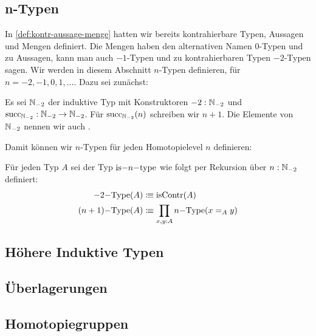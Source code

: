 \subsection{n-Typen}
In \cref{def:kontr-aussage-menge} hatten wir bereits kontrahierbare Typen, Aussagen und Mengen definiert.
Die Mengen haben den alternativen Namen $0$-Typen und zu Aussagen, kann man auch $-1$-Typen und zu kontrahierbaren Typen $-2$-Typen sagen.
Wir werden in diesem Abschnitt $n$-Typen definieren, für $n=-2,-1,0,1,\dots$.
Dazu sei zunächst:
\begin{definition}
  Es sei $\mathbb{N}_{-2}$ der induktive Typ mit Konstruktoren $-2:\mathbb{N}_{-2}$ und $\mathrm{succ}_{\mathbb{N}_{-2}}:\mathbb{N}_{-2}\to\mathbb{N}_{-2}$.
  Für $\mathrm{succ}_{\mathbb{N}_{-2}}(n)$ schreiben wir $n+1$.
  Die Elemente von $\mathbb{N}_{-2}$ nennen wir auch .
\end{definition}
Damit können wir $n$-Typen für jeden Homotopielevel $n$ definieren:
\begin{definition}
  Für jeden Typ $A$ sei der Typ $\mathrm{is-}{n}\mathrm{-type}$ wie folgt per Rekursion über $n:\mathbb{N}_{-2}$ definiert:
  \begin{align*}
    -2\mathrm{-Type}(A)&\vcentcolon\mspace{-1.2mu}\equiv \mathrm{isContr}(A) \\
    (n+1)\mathrm{-Type}(A)&\vcentcolon\mspace{-1.2mu}\equiv \prod_{x,y:A}n\mathrm{-Type}(x=_A y)
  \end{align*}
\end{definition}


\subsection{Höhere Induktive Typen}
\subsection{Überlagerungen}
\subsection{Homotopiegruppen}
